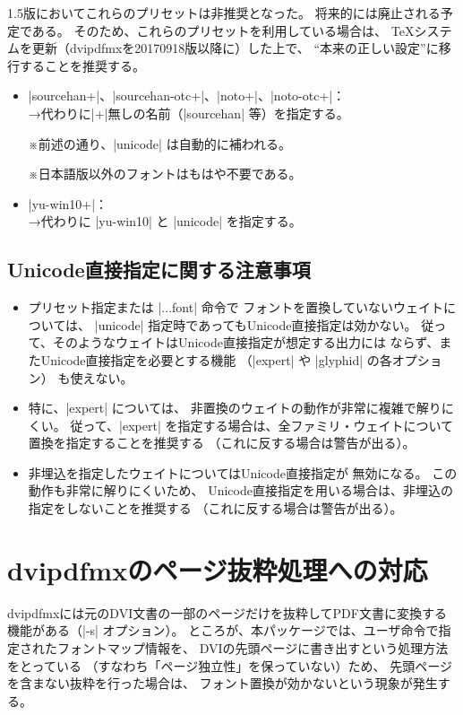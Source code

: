 \documentclass[uplatex,dvipdfmx,a4paper]{jsarticle}
\newcommand{\Note}{\par\noindent ※}
\providecommand{\Strong}[1]{\textsf{#1}}
\begin{document}
1.5版においてこれらのプリセットは\Strong{非推奨}となった。
将来的には廃止される予定である。
そのため、これらのプリセットを利用している場合は、
\Strong{{\TeX}システムを更新}（dvipdfmxを20170918版以降に）した上で、
“本来の正しい設定”に移行することを推奨する。

\begin{itemize}
\item |sourcehan+|、|sourcehan-otc+|、|noto+|、|noto-otc+|：\\
  →代わりに|+|無しの名前（|sourcehan| 等）を指定する。
  \Note 前述の通り、|unicode| は自動的に補われる。
  \Note 日本語版以外のフォントはもはや不要である。

\item |yu-win10+|：\\
  →代わりに |yu-win10| と |unicode| を指定する。
\end{itemize}

\subsection{Unicode直接指定に関する注意事項}
\label{ssec:DirectUnicodeNotice}

\begin{itemize}
\item プリセット指定または |\set...font| 命令で
  フォントを置換していないウェイトについては、
  |unicode| 指定時であってもUnicode直接指定は効かない。
  従って、そのようなウェイトはUnicode直接指定が想定する出力には
  ならず、またUnicode直接指定を必要とする機能
  （|expert| や |glyphid| の各オプション）
  も使えない。
\item 特に、|expert| については、
  非置換のウェイトの動作が非常に複雑で解りにくい。
  従って、|expert| を指定する場合は、全ファミリ・ウェイトについて
  置換を指定することを推奨する
  （これに反する場合は警告が出る）。
\item 非埋込を指定したウェイトについてはUnicode直接指定が
  無効になる。
  この動作も非常に解りにくいため、
  Unicode直接指定を用いる場合は、非埋込の指定をしないことを推奨する
  （これに反する場合は警告が出る）。
\end{itemize}


\section{dvipdfmxのページ抜粋処理への対応}
\label{sec:PageSelection}

dvipdfmxには元のDVI文書の一部のページだけを抜粋してPDF文書に変換する
機能がある（|-s| オプション）。
ところが、本パッケージでは、ユーザ命令で指定されたフォントマップ情報を、
DVIの先頭ページに書き出すという処理方法をとっている
（すなわち「ページ独立性」を保っていない）ため、
先頭ページを含まない抜粋を行った場合は、
フォント置換が効かないという現象が発生する。
\end{document}
